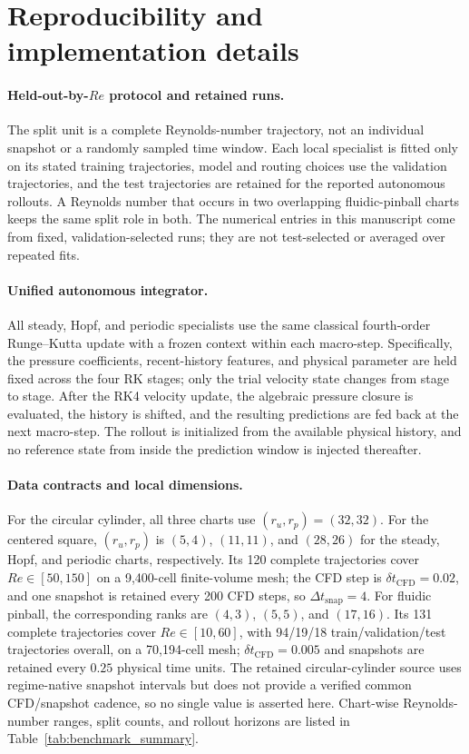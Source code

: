 \section{Reproducibility and implementation details}
\label{app:implementation}

\paragraph{Held-out-by-$Re$ protocol and retained runs.}
The split unit is a complete Reynolds-number trajectory, not an individual snapshot or a randomly sampled time window. Each local specialist is fitted only on its stated training trajectories, model and routing choices use the validation trajectories, and the test trajectories are retained for the reported autonomous rollouts. A Reynolds number that occurs in two overlapping fluidic-pinball charts keeps the same split role in both. The numerical entries in this manuscript come from fixed, validation-selected runs; they are not test-selected or averaged over repeated fits.

\paragraph{Unified autonomous integrator.}
All steady, Hopf, and periodic specialists use the same classical fourth-order Runge--Kutta update with a frozen context within each macro-step. Specifically, the pressure coefficients, recent-history features, and physical parameter are held fixed across the four RK stages; only the trial velocity state changes from stage to stage. After the RK4 velocity update, the algebraic pressure closure is evaluated, the history is shifted, and the resulting predictions are fed back at the next macro-step. The rollout is initialized from the available physical history, and no reference state from inside the prediction window is injected thereafter.

\paragraph{Data contracts and local dimensions.}
For the circular cylinder, all three charts use $(r_u,r_p)=(32,32)$. For the centered square, $(r_u,r_p)$ is $(5,4)$, $(11,11)$, and $(28,26)$ for the steady, Hopf, and periodic charts, respectively. Its 120 complete trajectories cover $Re\in[50,150]$ on a 9,400-cell finite-volume mesh; the CFD step is $\delta t_{\mathrm{CFD}}=0.02$, and one snapshot is retained every 200 CFD steps, so $\Delta t_{\mathrm{snap}}=4$. For fluidic pinball, the corresponding ranks are $(4,3)$, $(5,5)$, and $(17,16)$. Its 131 complete trajectories cover $Re\in[10,60]$, with 94/19/18 train/validation/test trajectories overall, on a 70,194-cell mesh; $\delta t_{\mathrm{CFD}}=0.005$ and snapshots are retained every $0.25$ physical time units. The retained circular-cylinder source uses regime-native snapshot intervals but does not provide a verified common CFD/snapshot cadence, so no single value is asserted here. Chart-wise Reynolds-number ranges, split counts, and rollout horizons are listed in Table~\ref{tab:benchmark_summary}.

